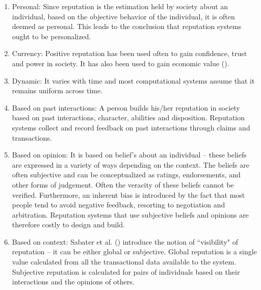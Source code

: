 \documentclass[a4paper,man,natbib]{apa6}
\begin{document}
\begin{enumerate}
\item Personal: Since reputation is the estimation held by society about an individual, based on the objective behavior of the individual, it is often deemed as personal. This leads to the conclusion that reputation systems ought to be personalized. %

\item Currency: Positive reputation has been used often to gain confidence, trust and power in society. It has also been used to gain economic value (\cite{Resnick_06a}). 

\item Dynamic: It varies with time and most computational systems assume that it remains uniform across time.

\item Based on past interactions: A person builds his/her reputation in society based on past interactions, character, abilities and disposition. Reputation systems collect and record feedback on past interactions through claims and transactions.

\item Based on opinion: It is based on belief's about an individual -- these beliefs are expressed in a variety of ways depending on the context. The beliefs are often subjective and can be conceptualized as ratings, endorsements, and other forms of judgement. Often the veracity of these beliefs cannot be verified. Furthermore, an inherent bias is introduced by the fact that most people tend to avoid negative feedback, resorting to negotiation and arbitration. Reputation systems that use subjective beliefs and opinions are therefore costly to design and build. 

\item Based on context: Sabater et al. (\cite{Sabater_05}) introduce the notion of ``visibility" of reputation -- it can be either global or subjective. Global reputation is a single value calculated from all the transactional data available to the system. Subjective reputation is calculated for pairs of individuals based on their interactions and the opinions of others.

\end{enumerate}
\end{document}
